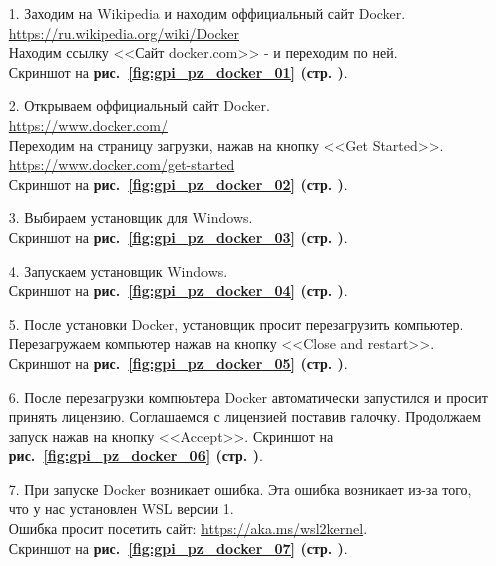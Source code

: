 \begin{itemize}
    \item[1.] Заходим на Wikipedia и находим оффициальный сайт Docker. \\
    \url{https://ru.wikipedia.org/wiki/Docker} \\
    Находим ссылку <<Сайт docker.com>> - и переходим по ней. \\
    Скриншот на \textbf{рис.~\ref{fig:gpi_pz_docker_01} (стр. \pageref{fig:gpi_pz_docker_01})}.

    \item[2.] Открываем оффициальный сайт Docker. \\
    \url{https://www.docker.com/} \\
    Переходим на страницу загрузки, нажав на кнопку <<Get Started>>. \\
    \url{https://www.docker.com/get-started} \\
    Скриншот на \textbf{рис.~\ref{fig:gpi_pz_docker_02} (стр. \pageref{fig:gpi_pz_docker_02})}.

    \item[3.] Выбираем установщик для Windows. \\
    Скриншот на \textbf{рис.~\ref{fig:gpi_pz_docker_03} (стр. \pageref{fig:gpi_pz_docker_03})}.

    \item[4.] Запускаем установщик Windows. \\
    Скриншот на \textbf{рис.~\ref{fig:gpi_pz_docker_04} (стр. \pageref{fig:gpi_pz_docker_04})}.

    \item[5.] После установки Docker, установщик просит перезагрузить компьютер.
    Перезагружаем компьютер нажав на кнопку <<Close and restart>>. \\
    Скриншот на \textbf{рис.~\ref{fig:gpi_pz_docker_05} (стр. \pageref{fig:gpi_pz_docker_05})}.

    \item[6.] После перезагрузки компюьтера Docker автоматически запустился и просит принять лицензию.
    Соглашаемся с лицензией поставив галочку.
    Продолжаем запуск нажав на кнопку <<Accept>>.
    Скриншот на \textbf{рис.~\ref{fig:gpi_pz_docker_06} (стр. \pageref{fig:gpi_pz_docker_06})}.

    \item[7.] При запуске Docker возникает ошибка.
    Эта ошибка возникает из-за того, что у нас установлен WSL версии 1. \\
    Ошибка просит посетить сайт: \url{https://aka.ms/wsl2kernel}. \\
    Скриншот на \textbf{рис.~\ref{fig:gpi_pz_docker_07} (стр. \pageref{fig:gpi_pz_docker_07})}.


\end{itemize}

